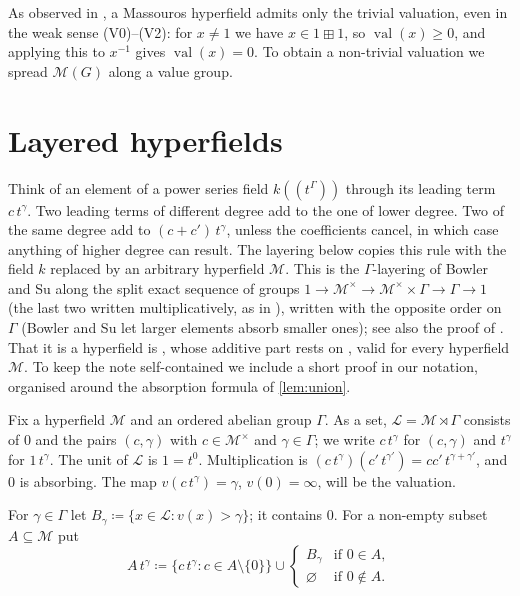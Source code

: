 \documentclass[11pt]{amsart}
\numberwithin{equation}{section}
\newcommand{\hplus}{\boxplus}
\newcommand{\val}{\operatorname{val}}
\newcommand{\Mas}{\mathcal M}
\newcommand{\Lay}{\mathcal L}
\newcommand{\lt}[2]{#1\,t^{#2}}
\begin{document}
As observed in \cite[\S7(2)]{Linzi25}, a Massouros hyperfield admits only the trivial valuation, even in the weak sense (V0)--(V2): for $x\ne1$ we have $x\in1\hplus1$, so $\val(x)\ge0$, and applying this to $x^{-1}$ gives $\val(x)=0$. To obtain a non-trivial valuation we spread $\Mas(G)$ along a value group.

\section{Layered hyperfields}\label{sec:layer}

Think of an element of a power series field $k((t^\Gamma))$ through its leading term $c\,t^\gamma$. Two leading terms of different degree add to the one of lower degree. Two of the same degree add to $(c+c')\,t^\gamma$, unless the coefficients cancel, in which case anything of higher degree can result. The layering below copies this rule with the field $k$ replaced by an arbitrary hyperfield $\Mas$. This is the $\Gamma$-layering of Bowler and Su \cite[Definition~4.1]{BowlerSu21} along the split exact sequence of groups $1\to\Mas^\times\to\Mas^\times\times\Gamma\to\Gamma\to1$ (the last two written multiplicatively, as in \cite{BowlerSu21}), written with the opposite order on $\Gamma$ (Bowler and Su let larger elements absorb smaller ones); see also the proof of \cite[Proposition~2.5]{LT25}. That it is a hyperfield is \cite[Lemma~4.2]{BowlerSu21}, whose additive part rests on \cite[Lemma~3.1]{BowlerSu21}, valid for every hyperfield $\Mas$. To keep the note self-contained we include a short proof in our notation, organised around the absorption formula of \cref{lem:union}.

Fix a hyperfield $\Mas$ and an ordered abelian group $\Gamma$. As a set, $\Lay=\Mas\rtimes\Gamma$ consists of $0$ and the pairs $(c,\gamma)$ with $c\in\Mas^\times$ and $\gamma\in\Gamma$; we write $c\,t^\gamma$ for $(c,\gamma)$ and $t^\gamma$ for $1\,t^\gamma$. The unit of $\Lay$ is $1=t^0$. Multiplication is $(c\,t^\gamma)(c'\,t^{\gamma'})=cc'\,t^{\gamma+\gamma'}$, and $0$ is absorbing. The map $v(c\,t^\gamma)=\gamma$, $v(0)=\infty$, will be the valuation.

\begin{definition}\label{def:At}
For $\gamma\in\Gamma$ let $B_\gamma\coloneqq\{x\in\Lay:v(x)>\gamma\}$; it contains $0$. For a non-empty subset $A\subseteq\Mas$ put
\[
  \lt{A}{\gamma}\coloneqq\{c\,t^\gamma: c\in A\setminus\{0\}\}\cup
  \begin{cases} B_\gamma & \text{if } 0\in A,\\ \varnothing & \text{if } 0\notin A.\end{cases}
\]
\end{definition}
\end{document}
